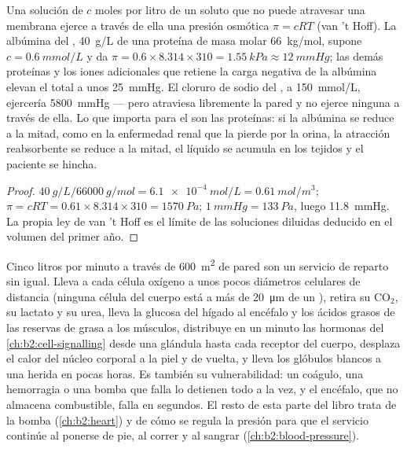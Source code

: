 \begin{theorem}\label{thm:b2:blood-circulation:oncotic}
Una solución de $c$ moles por litro de un soluto que no puede atravesar una
membrana ejerce a través de ella una presión osmótica $\pi = cRT$ (van 't
Hoff). La albúmina del , \qty{40}{g/L} de una proteína de masa molar
\qty{66}{kg/mol}, supone $c = \qty{0.6}{mmol/L}$ y da $\pi =
0.6\times 8.314\times 310 = \qty{1.55}{kPa} \approx \qty{12}{mmHg}$;
las demás proteínas y los iones adicionales que retiene la carga negativa
de la albúmina elevan el total a unos \qty{25}{mmHg}. El cloruro de sodio
del , a \qty{150}{mmol/L}, ejercería \qty{5800}{mmHg} --- pero
atraviesa libremente la pared  y no ejerce ninguna a través de
ella. Lo que importa para el  son las proteínas: si la albúmina se
reduce a la mitad, como en la enfermedad renal que la pierde por la orina,
la atracción reabsorbente se reduce a la mitad, el líquido se acumula en
los tejidos y el paciente se hincha.
\end{theorem}
\begin{proof}
$\qty{40}{g/L}/\qty{66000}{g/mol} = \qty{6.1e-4}{mol/L} =
\qty{0.61}{mol/m^3}$; $\pi = cRT = 0.61\times 8.314\times 310 =
\qty{1570}{Pa}$; $\qty{1}{mmHg} = \qty{133}{Pa}$, luego \qty{11.8}{mmHg}.
La propia ley de van 't Hoff es el límite de las soluciones diluidas
deducido en el volumen del primer año.
\end{proof}

\begin{example}\label{ex:b2:blood-circulation:transport}
Cinco litros por minuto a través de \qty{600}{m^2} de pared  son un
servicio de reparto sin igual. Lleva a cada célula oxígeno a unos pocos
diámetros celulares de distancia (ninguna célula del cuerpo está a más de
\qty{20}{\micro m} de un ), retira su $\mathrm{CO_2}$, su lactato y
su urea, lleva la glucosa del hígado al encéfalo y los ácidos grasos de las
reservas de grasa a los músculos, distribuye en un minuto las hormonas del
\cref{ch:b2:cell-signalling} desde una glándula hasta cada receptor del
cuerpo, desplaza el calor del núcleo corporal a la piel y de vuelta, y
lleva los glóbulos blancos a una herida en pocas horas. Es también su
vulnerabilidad: un coágulo, una hemorragia o una bomba que falla lo
detienen todo a la vez, y el encéfalo, que no almacena combustible, falla
en segundos. El resto de esta parte del libro trata de la bomba
(\cref{ch:b2:heart}) y de cómo se regula la presión para que el servicio
continúe al ponerse de pie, al correr y al sangrar
(\cref{ch:b2:blood-pressure}).
\end{example}

